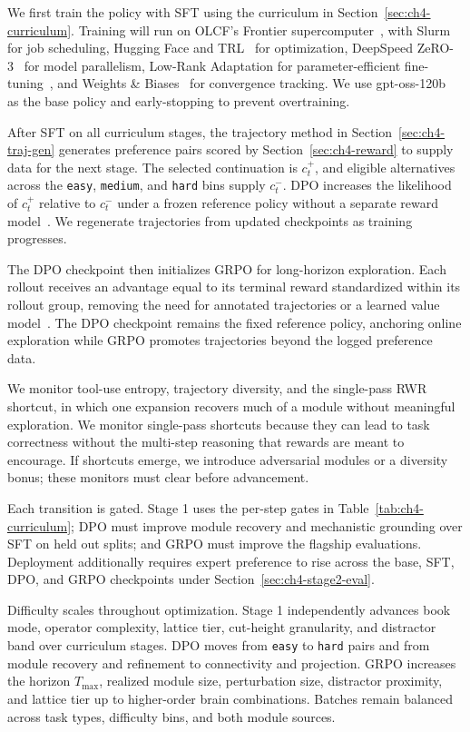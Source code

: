 \documentclass[thesis,letterpaper,12pt]{utthesis}
\begin{document}
We first train the policy with SFT using the curriculum in Section~\ref{sec:ch4-curriculum}. Training will run on OLCF's Frontier supercomputer~\cite{frontier}, with Slurm~\cite{slurm} for job scheduling, Hugging Face and TRL~\cite{trl} for optimization, DeepSpeed ZeRO-3~\cite{deepspeed} for model parallelism, Low-Rank Adaptation for parameter-efficient fine-tuning~\cite{hu2022lora}, and Weights \& Biases~\cite{wandb} for convergence tracking. We use gpt-oss-120b~\cite{gpt-oss} as the base policy and early-stopping to prevent overtraining.

After SFT on all curriculum stages, the trajectory method in Section~\ref{sec:ch4-traj-gen} generates preference pairs scored by Section~\ref{sec:ch4-reward} to supply data for the next stage. The selected continuation is $c_t^+$, and eligible alternatives across the \texttt{easy}, \texttt{medium}, and \texttt{hard} bins supply $c_t^-$. DPO increases the likelihood of $c_t^+$ relative to $c_t^-$ under a frozen reference policy without a separate reward model~\cite{dpo}. We regenerate trajectories from updated checkpoints as training progresses.

The DPO checkpoint then initializes GRPO for long-horizon exploration. Each rollout receives an advantage equal to its terminal reward standardized within its rollout group, removing the need for annotated trajectories or a learned value model~\cite{shao2024deepseekmath}. The DPO checkpoint remains the fixed reference policy, anchoring online exploration while GRPO promotes trajectories beyond the logged preference data.

We monitor tool-use entropy, trajectory diversity, and the single-pass RWR shortcut, in which one expansion recovers much of a module without meaningful exploration. We monitor single-pass shortcuts because they can lead to task correctness without the multi-step reasoning that rewards are meant to encourage. If shortcuts emerge, we introduce adversarial modules or a diversity bonus; these monitors must clear before advancement.

Each transition is gated. Stage 1 uses the per-step gates in Table~\ref{tab:ch4-curriculum}; DPO must improve module recovery and mechanistic grounding over SFT on held out splits; and GRPO must improve the flagship evaluations. Deployment additionally requires expert preference to rise across the base, SFT, DPO, and GRPO checkpoints under Section~\ref{sec:ch4-stage2-eval}.

Difficulty scales throughout optimization. Stage 1 independently advances book mode, operator complexity, lattice tier, cut-height granularity, and distractor band over curriculum stages. DPO moves from \texttt{easy} to \texttt{hard} pairs and from module recovery and refinement to connectivity and projection. GRPO increases the horizon $T_{\max}$, realized module size, perturbation size, distractor proximity, and lattice tier up to higher-order brain combinations. Batches remain balanced across task types, difficulty bins, and both module sources.
\end{document}
